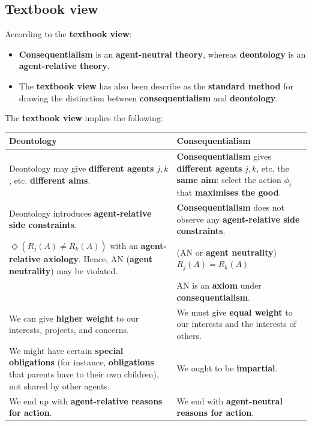 \documentclass[11pt]{article}
\begin{document}
 \newpage
\subsection{Textbook view}
\label{sec:org76cf380}
According to the \textbf{textbook view}:
\begin{itemize}
\item \textbf{Consequentialism} is an \textbf{agent-neutral theory}, whereas \textbf{deontology} is an \textbf{agent-relative theory}.
\item The \textbf{textbook view} has also been describe as the \textbf{standard method} for drawing the distinction between \textbf{consequentialism} and \textbf{deontology}.
\end{itemize}

The \textbf{textbook view} implies the following:
\begin{center}
\begin{tabularx}{\textwidth}{|X|X|}
\hline
Deontology & Consequentialism\\
\hline
Deontology may give \textbf{different agents} \(j, k\), etc. \textbf{different aims}. & \textbf{Consequentialism} gives \textbf{different agents} \(j, k\), etc. the \textbf{same aim}: select the action \(\phi_i\) that \textbf{maximises the good}.\\
\hline
Deontology introduces \textbf{agent-relative side constraints}. & \textbf{Consequentialism} does not observe any \textbf{agent-relative side constraints}.\\
\hline
\(\Diamond(R_j (A) \ne R_k (A))\) with an \textbf{agent-relative axiology}. Hence, AN (\textbf{agent neutrality}) may be violated. & (AN or \textbf{agent neutrality}) \(R_j (A) = R_k (A)\)\\
 & AN is an \textbf{axiom} under \textbf{consequentialism}.\\
\hline
We can give \textbf{higher weight} to our interests, projects, and concerns. & We must give \textbf{equal weight} to our interests and the interests of others.\\
\hline
We might have certain \textbf{special obligations} (for instance, \textbf{obligations} that parents have to their own children), not shared by other agents. & We ought to be \textbf{impartial}.\\
\hline
We end up with \textbf{agent-relative reasons for action}. & We end with \textbf{agent-neutral reasons for action}.\\
\hline
\end{tabularx}
\end{center}
\end{document}
